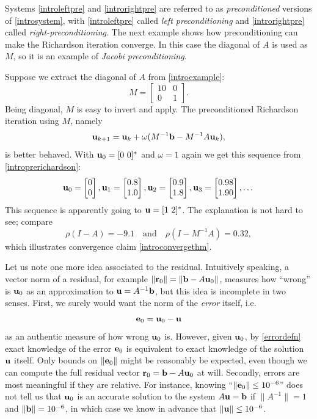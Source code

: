 Systems \eqref{introleftpre} and \eqref{introrightpre} are referred to as \emph{preconditioned} versions of \eqref{introsystem}, with \eqref{introleftpre} called \emph{left preconditioning} and \eqref{introrightpre} called \emph{right-preconditioning}.  The next example shows how preconditioning can make the Richardson iteration converge.  In this case the diagonal of $A$ is used as $M$, so it is an example of \emph{Jacobi preconditioning}.

\medskip\noindent\hrulefill
\begin{examplecont}  Suppose we extract the diagonal of $A$ from  \eqref{introexample}:
\begin{equation}
M = \begin{bmatrix}
10 & 0 \\ 0 & 1
\end{bmatrix}.  \label{introM}
\end{equation}
Being diagonal, $M$ is easy to invert and apply.  The preconditioned Richardson iteration using $M$, namely
\begin{equation}
\mathbf{u}_{k+1} = \mathbf{u}_k + \omega (M^{-1} \mathbf{b} - M^{-1} A \mathbf{u}_k),  \label{introprerichardson}
\end{equation}
is better behaved.  With $\mathbf{u}_0 = [0\,\, 0]^*$ and $\omega=1$ again we get this sequence from \eqref{introprerichardson}:
\begin{equation}
\mathbf{u}_{0} = \begin{bmatrix} 0 \\ 0 \end{bmatrix}, \mathbf{u}_{1} = \begin{bmatrix} 0.8 \\ 1.0 \end{bmatrix}, \mathbf{u}_{2} = \begin{bmatrix} 0.9 \\ 1.8 \end{bmatrix}, \mathbf{u}_{3} = \begin{bmatrix} 0.98 \\ 1.90 \end{bmatrix}, \dots
\end{equation}
This sequence is apparently going to $\mathbf{u} = [1\,\, 2]^*$.  The explanation is not hard to see; compare
\begin{equation}
\rho(I-A) = -9.1 \quad \text{and} \quad \rho(I-M^{-1} A) = 0.32,
\end{equation}
which illustrates convergence claim \eqref{introconvergethm}.
\end{examplecont}
\noindent\hrulefill

\medskip
Let us note one more idea associated to the residual.  Intuitively speaking, a vector norm of a residual, for example $\|\mathbf{r}_0\| = \|\mathbf{b} - A \mathbf{u}_0\|$, measures how ``wrong'' is $\mathbf{u}_0$ as an approximation to $\mathbf{u}=A^{-1}\mathbf{b}$, but this idea is incomplete in two senses.  First, we surely would want the norm of the \emph{error} itself, i.e.
\begin{equation}
\mathbf{e}_0 = \mathbf{u}_0 - \mathbf{u} \label{errordefn}
\end{equation}
as an authentic measure of how wrong $\mathbf{u}_0$ is.  However, given $\mathbf{u}_0$, by \eqref{errordefn} exact knowledge of the error $\mathbf{e}_0$ is equivalent to exact knowledge of the solution $\mathbf{u}$ itself.  Only bounds on $\|\mathbf{e}_0\|$ might be reasonably be expected, even though we can compute the full residual vector $\mathbf{r}_0 = \mathbf{b} - A \mathbf{u}_0$ at will.  Secondly, errors are most meaningful if they are relative.  For instance, knowing ``$\|\mathbf{e}_0\|\le 10^{-6}$'' does not tell us that $\mathbf{u}_0$ is an accurate solution to the system $A \mathbf{u} = \mathbf{b}$ if $\|A^{-1}\|=1$ and $\|\mathbf{b}\|= 10^{-6}$, in which case we know in advance that $\|\mathbf{u}\|\le 10^{-6}$.

